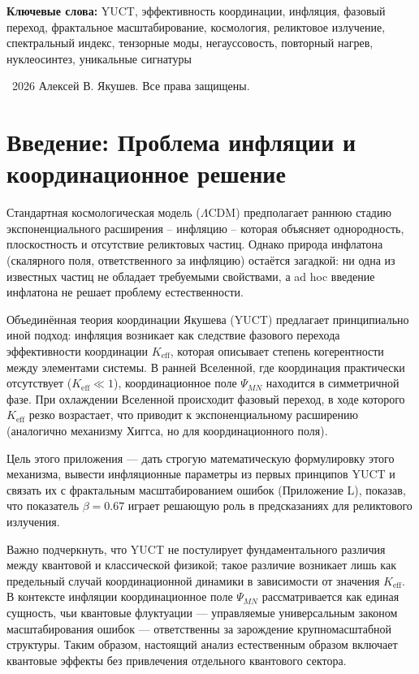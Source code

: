 \documentclass[12pt,a4paper]{article}
\theoremstyle{remark}
\newcommand{\Keff}{K_{\mathrm{eff}}}
\begin{document}
\begin{titlepage}
		\vspace{0.5cm}
		
		\noindent
		{\small\textbf{Ключевые слова:}} YUCT, эффективность координации, инфляция, фазовый переход, фрактальное масштабирование, космология, реликтовое излучение, спектральный индекс, тензорные моды, негауссовость, повторный нагрев, нуклеосинтез, уникальные сигнатуры
		
		\vspace{0.5cm}
		
		\noindent
		\textcopyright\ 2026 Алексей В. Якушев. Все права защищены.
	\end{titlepage}
	
	\tableofcontents
	\newpage
	
	\section{Введение: Проблема инфляции и координационное решение}
	\label{sec:intro}
	
	Стандартная космологическая модель ($\Lambda$CDM) предполагает раннюю стадию экспоненциального расширения – инфляцию – которая объясняет однородность, плоскостность и отсутствие реликтовых частиц. Однако природа инфлатона (скалярного поля, ответственного за инфляцию) остаётся загадкой: ни одна из известных частиц не обладает требуемыми свойствами, а ad hoc введение инфлатона не решает проблему естественности.
	
	Объединённая теория координации Якушева (YUCT) предлагает принципиально иной подход: инфляция возникает как следствие фазового перехода эффективности координации $\Keff$, которая описывает степень когерентности между элементами системы. В ранней Вселенной, где координация практически отсутствует ($\Keff \ll 1$), координационное поле $\Psi_{MN}$ находится в симметричной фазе. При охлаждении Вселенной происходит фазовый переход, в ходе которого $\Keff$ резко возрастает, что приводит к экспоненциальному расширению (аналогично механизму Хиггса, но для координационного поля).
	
	Цель этого приложения — дать строгую математическую формулировку этого механизма, вывести инфляционные параметры из первых принципов YUCT и связать их с фрактальным масштабированием ошибок (Приложение L), показав, что показатель $\beta = 0.67$ играет решающую роль в предсказаниях для реликтового излучения.
	
	Важно подчеркнуть, что YUCT не постулирует фундаментального различия между квантовой и классической физикой; такое различие возникает лишь как предельный случай координационной динамики в зависимости от значения $K_{\mathrm{eff}}$. В контексте инфляции координационное поле $\Psi_{MN}$ рассматривается как единая сущность, чьи квантовые флуктуации — управляемые универсальным законом масштабирования ошибок — ответственны за зарождение крупномасштабной структуры. Таким образом, настоящий анализ естественным образом включает квантовые эффекты без привлечения отдельного квантового сектора.
	
\end{document}
